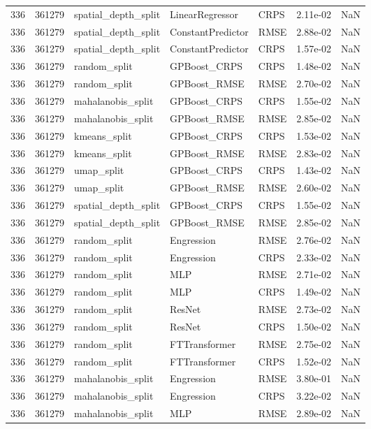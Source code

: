 \begin{tabular}{rrlllrr}
336 & 361279 & spatial\_depth\_split & LinearRegressor & CRPS & 2.11e-02 & NaN \\
336 & 361279 & spatial\_depth\_split & ConstantPredictor & RMSE & 2.88e-02 & NaN \\
336 & 361279 & spatial\_depth\_split & ConstantPredictor & CRPS & 1.57e-02 & NaN \\
336 & 361279 & random\_split & GPBoost\_CRPS & CRPS & 1.48e-02 & NaN \\
336 & 361279 & random\_split & GPBoost\_RMSE & RMSE & 2.70e-02 & NaN \\
336 & 361279 & mahalanobis\_split & GPBoost\_CRPS & CRPS & 1.55e-02 & NaN \\
336 & 361279 & mahalanobis\_split & GPBoost\_RMSE & RMSE & 2.85e-02 & NaN \\
336 & 361279 & kmeans\_split & GPBoost\_CRPS & CRPS & 1.53e-02 & NaN \\
336 & 361279 & kmeans\_split & GPBoost\_RMSE & RMSE & 2.83e-02 & NaN \\
336 & 361279 & umap\_split & GPBoost\_CRPS & CRPS & 1.43e-02 & NaN \\
336 & 361279 & umap\_split & GPBoost\_RMSE & RMSE & 2.60e-02 & NaN \\
336 & 361279 & spatial\_depth\_split & GPBoost\_CRPS & CRPS & 1.55e-02 & NaN \\
336 & 361279 & spatial\_depth\_split & GPBoost\_RMSE & RMSE & 2.85e-02 & NaN \\
336 & 361279 & random\_split & Engression & RMSE & 2.76e-02 & NaN \\
336 & 361279 & random\_split & Engression & CRPS & 2.33e-02 & NaN \\
336 & 361279 & random\_split & MLP & RMSE & 2.71e-02 & NaN \\
336 & 361279 & random\_split & MLP & CRPS & 1.49e-02 & NaN \\
336 & 361279 & random\_split & ResNet & RMSE & 2.73e-02 & NaN \\
336 & 361279 & random\_split & ResNet & CRPS & 1.50e-02 & NaN \\
336 & 361279 & random\_split & FTTransformer & RMSE & 2.75e-02 & NaN \\
336 & 361279 & random\_split & FTTransformer & CRPS & 1.52e-02 & NaN \\
336 & 361279 & mahalanobis\_split & Engression & RMSE & 3.80e-01 & NaN \\
336 & 361279 & mahalanobis\_split & Engression & CRPS & 3.22e-02 & NaN \\
336 & 361279 & mahalanobis\_split & MLP & RMSE & 2.89e-02 & NaN \\

\end{tabular}
